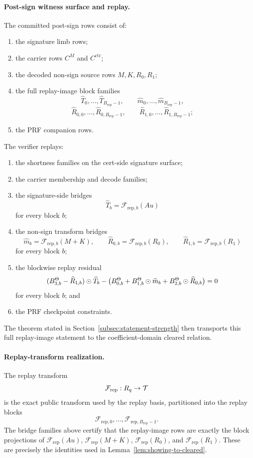 \paragraph{Post-sign witness surface and replay.}
The committed post-sign rows consist of:
\begin{enumerate}[leftmargin=1.25em]
    \item the signature limb rows;
    \item the carrier rows \(C^M\) and \(C^{\mathrm{ctr}}\);
    \item the decoded non-sign source rows \(M,K,R_0,R_1\);
    \item the full replay-image block families
    \[
    \widehat T_0,\ldots,\widehat T_{B_{\mathrm{rep}}-1},\qquad
    \widehat m_0,\ldots,\widehat m_{B_{\mathrm{rep}}-1},
    \]
    \[
    \widehat R_{0,0},\ldots,\widehat R_{0,B_{\mathrm{rep}}-1},\qquad
    \widehat R_{1,0},\ldots,\widehat R_{1,B_{\mathrm{rep}}-1};
    \]
    \item the PRF companion rows.
\end{enumerate}
The verifier replays:
\begin{enumerate}[leftmargin=1.25em]
    \item the shortness families on the cert-side signature surface;
    \item the carrier membership and decode families;
    \item the signature-side bridges
    \[
    \widehat T_b = \mathcal F_{\mathrm{rep},b}(Au)
    \]
    for every block \(b\);
    \item the non-sign transform bridges
    \[
    \widehat m_b = \mathcal F_{\mathrm{rep},b}(M+K),\qquad
    \widehat R_{0,b} = \mathcal F_{\mathrm{rep},b}(R_0),\qquad
    \widehat R_{1,b} = \mathcal F_{\mathrm{rep},b}(R_1)
    \]
    for every block \(b\);
    \item the blockwise replay residual
    \[
    (B_{3,b}^\Theta-\widehat R_{1,b})\odot \widehat T_b
    -
    \bigl(B_{0,b}^\Theta + B_{1,b}^\Theta\odot \widehat m_b + B_{2,b}^\Theta\odot \widehat R_{0,b}\bigr)=0
    \]
    for every block \(b\); and
    \item the PRF checkpoint constraints.
\end{enumerate}
The theorem stated in Section~\ref{subsec:statement-strength} then transports
this full replay-image statement to the coefficient-domain cleared relation.

\paragraph{Replay-transform realization.}
The replay transform
\[
\mathcal F_{\mathrm{rep}} : R_q \to \mathcal T
\]
is the exact public transform used by the replay basis, partitioned into the
replay blocks
\[
\mathcal F_{\mathrm{rep},0},\ldots,\mathcal F_{\mathrm{rep},B_{\mathrm{rep}}-1}.
\]
The bridge families above certify that the replay-image rows are exactly the
block projections of \(\mathcal F_{\mathrm{rep}}(Au)\),
\(\mathcal F_{\mathrm{rep}}(M+K)\), \(\mathcal F_{\mathrm{rep}}(R_0)\), and
\(\mathcal F_{\mathrm{rep}}(R_1)\). These are precisely the identities used in
Lemma~\ref{lem:showing-to-cleared}.

